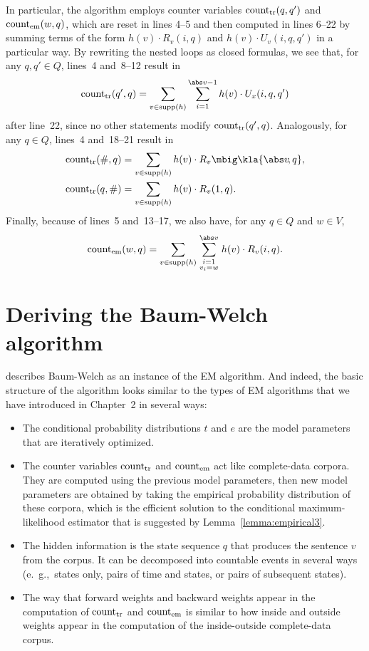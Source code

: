 In particular, the algorithm employs counter variables $\operatorname{count}_\mathrm{tr}(q,q')$
and $\operatorname{count}_\mathrm{em}(w,q)$, which are reset in lines 4--5 and then computed in
lines 6--22 by summing terms of the form $h(v) \cdot R_v(i,q)$ and
$h(v)\cdot U_v(i,q,q')$ in a particular way. By rewriting the nested loops as
closed formulas, we see that, for any $q,q'\in Q$, lines~4 and~8--12 result in
\begin{equation}\label{eq:03-bw-start}
 \cnt_\mathrm{tr}(q',q) = \sum_{v\in\operatorname{supp}(h)} \sum_{i=1}^{\abs v-1} h(v) \cdot U_x(i,q,q')
\end{equation}
after line~22, since no other statements modify $\operatorname{count}_\mathrm{tr}(q',q)$.
Analogously, for any $q\in Q$, lines~4 and~18--21 result in
\begin{align}
 \cnt_\mathrm{tr}(\#,q) &= \sum_{v\in\operatorname{supp}(h)} h(v) \cdot R_v\mbig\kla{\abs v\!,q}, \\
 \cnt_\mathrm{tr}(q,\#) &= \sum_{v\in\operatorname{supp}(h)} h(v) \cdot R_v(1,q).
\end{align}
Finally, because of lines~5 and~13--17, we also have, for any $q\in Q$ and $w\in V$,
\begin{equation}\label{eq:03-bw-end}
 \cnt_\mathrm{em}(w,q) = \sum_{v\in\operatorname{supp}(h)} \sum_{{\scriptstyle i=1}\atop{\scriptstyle v_i=w}}^{\abs v} h(v) \cdot R_v(i,q).
\end{equation}

\section{Deriving the Baum-Welch algorithm}\label{sect:03-deriving}

\cite{jm09} describes Baum-Welch as an instance of the EM algorithm. And
indeed, the basic structure of the algorithm looks similar to the types of EM
algorithms that we have introduced in Chapter~2 in several ways:
\begin{itemize}\setlength\itemsep{-0.1em}
 \item The conditional probability distributions $t$ and $e$ are the model
  parameters that are iteratively optimized.
 \item The counter variables $\operatorname{count}_\mathrm{tr}$ and $\operatorname{count}_\mathrm{em}$ act like
  complete-data corpora. They are computed using the previous model parameters,
  then new model parameters are obtained by taking the empirical probability
  distribution of these corpora, which is the efficient solution to the
  conditional maximum-likelihood estimator that is suggested by
  Lemma~\ref{lemma:empirical3}.
 \item The hidden information is the state sequence $q$ that produces the
  sentence $v$ from the corpus. It can be decomposed into countable events in
  several ways (e.~g.,~states only, pairs of time and states, or pairs of
  subsequent states).
 \item The way that forward weights and backward weights appear in the
  computation of $\operatorname{count}_\mathrm{tr}$ and $\operatorname{count}_\mathrm{em}$ is similar to how
  inside and outside weights appear in the computation of the inside-outside
  complete-data corpus.
\end{itemize}

